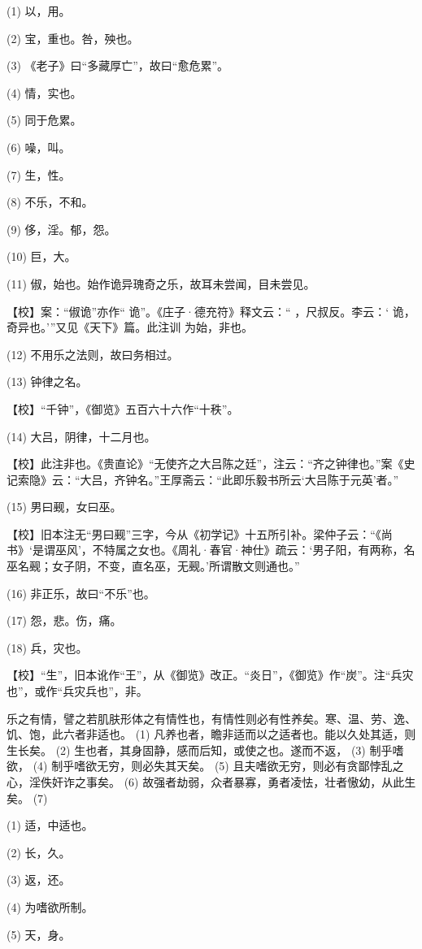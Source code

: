 \documentclass[12pt,UTF8]{ctexbook}
\begin{document}
(1) 以，用。

(2) 宝，重也。咎，殃也。

(3) 《老子》曰“多藏厚亡”，故曰“愈危累”。

(4) 情，实也。

(5) 同于危累。

(6) 噪，叫。

(7) 生，性。

(8) 不乐，不和。

(9) 侈，淫。郁，怨。

(10) 巨，大。

(11) 俶，始也。始作诡异瑰奇之乐，故耳未尝闻，目未尝见。

【校】案：“俶诡”亦作“ 诡”。《庄子·德充符》释文云：“ ，尺叔反。李云：‘ 诡，奇异也。’”又见《天下》篇。此注训 为始，非也。

(12) 不用乐之法则，故曰务相过。

(13) 钟律之名。

【校】“千钟”，《御览》五百六十六作“十秩”。

(14) 大吕，阴律，十二月也。

【校】此注非也。《贵直论》“无使齐之大吕陈之廷”，注云：“齐之钟律也。”案《史记索隐》云：“大吕，齐钟名。”王厚斋云：“此即乐毅书所云‘大吕陈于元英’者。”

(15) 男曰觋，女曰巫。

【校】旧本注无“男曰觋”三字，今从《初学记》十五所引补。梁仲子云：“《尚书》‘是谓巫风’，不特属之女也。《周礼·春官·神仕》疏云：‘男子阳，有两称，名巫名觋；女子阴，不变，直名巫，无觋。’所谓散文则通也。”

(16) 非正乐，故曰“不乐”也。

(17) 怨，悲。伤，痛。

(18) 兵，灾也。

【校】“生”，旧本讹作“王”，从《御览》改正。“炎日”，《御览》作“炭”。注“兵灾也”，或作“兵灾兵也”，非。

乐之有情，譬之若肌肤形体之有情性也，有情性则必有性养矣。寒、温、劳、逸、饥、饱，此六者非适也。 (1) 凡养也者，瞻非适而以之适者也。能以久处其适，则生长矣。 (2) 生也者，其身固静，感而后知，或使之也。遂而不返， (3) 制乎嗜欲， (4) 制乎嗜欲无穷，则必失其天矣。 (5) 且夫嗜欲无穷，则必有贪鄙悖乱之心，淫佚奸诈之事矣。 (6) 故强者劫弱，众者暴寡，勇者凌怯，壮者慠幼，从此生矣。 (7)

(1) 适，中适也。

(2) 长，久。

(3) 返，还。

(4) 为嗜欲所制。

(5) 天，身。
\end{document}
